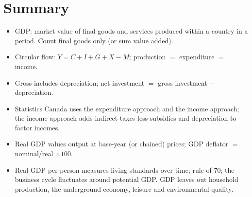 \section{Summary}

\begin{itemize}
  \item GDP: market value of final goods and services produced within a country in a
        period. Count final goods only (or sum value added).
  \item Circular flow: $Y = C + I + G + X - M$; production $=$ expenditure $=$ income.
  \item Gross includes depreciation; net investment $=$ gross investment $-$
        depreciation.
  \item Statistics Canada uses the expenditure approach and the income approach; the
        income approach adds indirect taxes less subsidies and depreciation to factor
        incomes.
  \item Real GDP values output at base-year (or chained) prices; GDP deflator $=$
        nominal/real $\times 100$.
  \item Real GDP per person measures living standards over time; rule of 70; the business
        cycle fluctuates around potential GDP. GDP leaves out household production, the
        underground economy, leisure and environmental quality.
\end{itemize}
